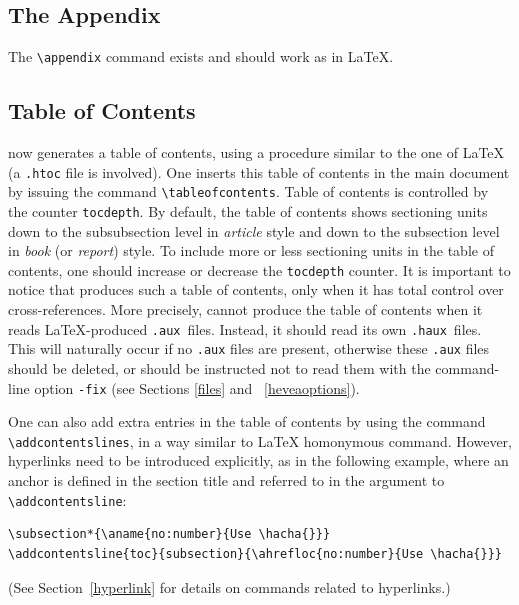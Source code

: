 \subsection{The Appendix}
The \verb+\appendix+ command exists and should work as in \LaTeX.

\subsection{Table of Contents}
%
%
\hevea{} now generates a table of contents, using a procedure similar
to the one of \LaTeX
(a \texttt{.htoc} file is involved).
One inserts this table of contents in the main document by issuing
the command \verb+\tableofcontents+.
Table of contents is controlled by the counter  \verb+tocdepth+.
By default, the table of contents shows sectioning units down to the
subsubsection level in \textit{article} style and down to the subsection level
in \textit{book} (or \textit{report}) style. To include more or less
sectioning units in the
table of contents, one should increase or decrease the \verb+tocdepth+
counter.
It is important to notice that \hevea{} produces such a table of
contents, only when it has total control over cross-references.
More precisely, \hevea{} cannot produce the table of contents when it
reads \LaTeX{}-produced \texttt{.aux}~files.
Instead, it should read its own \texttt{.haux}~files.
This will naturally occur if no \texttt{.aux} files are present,
otherwise these \texttt{.aux} files should be deleted, or \hevea{}
should be instructed not to read them with the command-line option
\texttt{-fix}
(see Sections \ref{files} and ~\ref{heveaoptions}).

One can also add extra entries in the table of contents by using
the command \verb+\addcontentslines+, in a way similar
to \LaTeX{} homonymous command.
However, hyperlinks need to be introduced explicitly,
as in the following example, where
an anchor is defined in the section title and referred to in the
argument to \verb+\addcontentsline+:
\begin{verbatim}
\subsection*{\aname{no:number}{Use \hacha{}}}
\addcontentsline{toc}{subsection}{\ahrefloc{no:number}{Use \hacha{}}}
\end{verbatim}
(See Section~\ref{hyperlink} for details on commands related to hyperlinks.)


